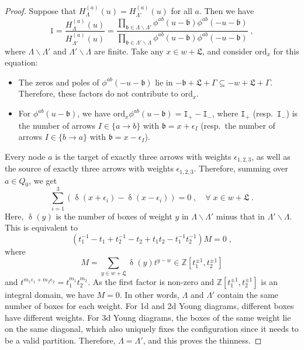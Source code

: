 \documentclass[11pt]{article}
\numberwithin{equation}{section}
\numberwithin{figure}{section}
\numberwithin{table}{section}
\begin{document}
\begin{proof}
	Suppose that $H^{(a)}_\Lambda(u)=H^{(a)}_{\Lambda'}(u)$ for all $a$. Then we have
	\begin{equation}
		1=\frac{H^{(a)}_\Lambda(u)}{H^{(a)}_{\Lambda'}(u)}=\frac{\prod\limits_{\mathfrak{b}\in\Lambda\backslash\Lambda'}\phi^{ab}(u-\mathfrak{b})\phi^{ab}(-u-\mathfrak{b})}{\prod\limits_{\mathfrak{b}\in\Lambda'\backslash\Lambda}\phi^{ab}(u-\mathfrak{b})\phi^{ab}(-u-\mathfrak{b})}\;,
	\end{equation}
	where $\Lambda\backslash\Lambda'$ and $\Lambda'\backslash\Lambda$ are finite. Take any $x\in w+\mathfrak{L}$, and consider $\mathrm{ord}_x$ for this equation:
	\begin{itemize}
		\item The zeros and poles of $\phi^{ab}(-u-\mathfrak{b})$ lie in $-\mathfrak{b}+\mathfrak{L}+\Gamma\subseteq-w+\mathfrak{L}+\Gamma$. Therefore, these factors do not contribute to $\mathrm{ord}_x$.
		\item For $\phi^{ab}(u-\mathfrak{b})$, we have $\mathrm{ord}_x\phi^{ab}(u-\mathfrak{b})=\mathtt{I}_+-\mathtt{I}_-$, where $\mathtt{I}_+$ (resp.~$\mathtt{I}_-$) is the number of arrows $I\in\{a\rightarrow b\}$ with $\mathfrak{b}=x+\epsilon_I$ (resp.~the number of arrows $I\in\{b\rightarrow a\}$ with $\mathfrak{b}=x-\epsilon_I$).
	\end{itemize}
	Every node $a$ is the target of exactly three arrows with weights $\epsilon_{1,2,3}$, as well as the source of exactly three arrows with weights $\epsilon_{1,2,3}$. Therefore, summing over $a\in Q_0$, we get
	\begin{equation}
		\sum_{i=1}^3\left(\updelta(x+\epsilon_i)-\updelta(x-\epsilon_i)\right)=0\;,\quad\forall \;x\in w+\mathfrak{L}\;.
	\end{equation}
	Here, $\updelta(y)$ is the number of boxes of weight $y$ in $\Lambda\backslash\Lambda'$ minus that in $\Lambda'\backslash\Lambda$. This is equivalent to
	\begin{equation}
		\left(t_1^{-1}-t_1+t_2^{-1}-t_2+t_1t_2-t_1^{-1}t_2^{-1}\right)M=0\;,
	\end{equation}
	where
	\begin{equation}
		M=\sum_{y\in w+\mathfrak{L}}\updelta(y)t^{y-w}\in\mathbb{Z}\left[t_1^{\pm1},t_2^{\pm1}\right]
	\end{equation}
	and $t^{m_1\epsilon_1+m_2\epsilon_2}=t_1^{m_1}t_2^{m_2}$. As the first factor is non-zero and $\mathbb{Z}\left[t_1^{\pm1},t_2^{\pm1}\right]$ is an integral domain, we have $M=0$. In other words, $\Lambda$ and $\Lambda'$ contain the same number of boxes for each weight. For 1d and 2d Young diagrams, different boxes have different weights. For 3d Young diagrams, the boxes of the same weight lie on the same diagonal, which also uniquely fixes the configuration since it needs to be a valid partition. Therefore, $\Lambda=\Lambda'$, and this proves the thinness.
	

\end{proof}
\end{document}
